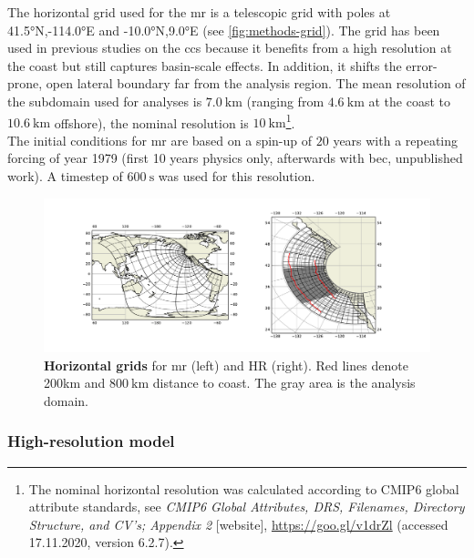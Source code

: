 The horizontal grid used for the \ac{mr} is a telescopic grid \autocite{bentsen-1999-roms-grid-telescope} with poles at \ang{41.5}N,\ang{-114.0}E and \ang{-10.0}N,\ang{9.0}E (see \autoref{fig:methods-grid}). The grid has been used in previous studies on the \ac{ccs} \autocite{frischknecht-2017-roms-bec-parameters, frischknecht-2018-3dpump} because it benefits from a high resolution at the coast but still captures basin-scale effects. In addition, it shifts the error-prone, open lateral boundary far from the analysis region. The mean resolution of the subdomain used for analyses is $\SI{7.0}{\kilo\metre}$ (ranging from $\SI{4.6}{\kilo\metre}$ at the coast to $\SI{10.6}{\kilo\metre}$ offshore), the nominal resolution is $\SI{10}{\kilo\metre}$\footnote{The nominal horizontal resolution was calculated according to CMIP6 global attribute standards, see \textit{CMIP6 Global Attributes, DRS, Filenames, Directory Structure, and CV’s; Appendix 2} [website], \href{https://goo.gl/v1drZl}{https://goo.gl/v1drZl} (accessed 17.11.2020, version 6.2.7).\label{fn:nominal-resolution}}.\\
The initial conditions for \ac{mr} are based on a spin-up of $20$ years with a repeating forcing of year 1979 (first 10 years physics only, afterwards with \ac{bec}, unpublished work). A timestep of $\SI{600}{\second}$ was used for this resolution.
\begin{figure}[h]
    \centering
    \includegraphics[width=15cm, trim=2cm 0 2cm 0]{../figures/methods_grid.pdf}
    \caption[Horizontal grids]{\textbf{Horizontal grids} for \ac{mr} (left) and HR (right). Red lines denote 200km and $\SI{800}{\kilo\metre}$ distance to coast. The gray area is the analysis domain.}\label{fig:methods-grid}
\end{figure}

\subsubsection{High-resolution model}

